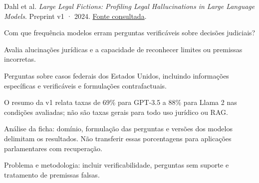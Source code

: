{\small Dahl et al. \textit{Large Legal Fictions: Profiling Legal Hallucinations in Large Language Models}. Preprint v1 · 2024. \href{https://arxiv.org/pdf/2401.01301v1}{Fonte consultada}.\par}

Com que frequência modelos erram perguntas verificáveis sobre decisões judiciais?

Avalia alucinações jurídicas e a capacidade de reconhecer limites ou premissas incorretas.

Perguntas sobre casos federais dos Estados Unidos, incluindo informações específicas e verificáveis e formulações contrafactuais.

O resumo da v1 relata taxas de 69\% para GPT-3.5 a 88\% para Llama 2 nas condições avaliadas; não são taxas gerais para todo uso jurídico ou RAG.

\begin{itemize}
\end{itemize}

Análise da ficha: domínio, formulação das perguntas e versões dos modelos delimitam os resultados. Não transferir essas porcentagens para aplicações parlamentares com recuperação.

Problema e metodologia: incluir verificabilidade, perguntas sem suporte e tratamento de premissas falsas.

